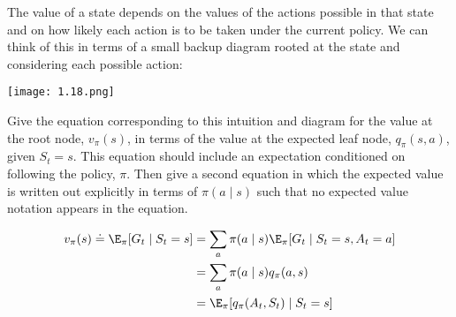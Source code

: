 
\begin{exercise}[Exercise 3.18]

The value of a state depends on the values of the actions possible in that state and on how likely each action is to be taken under the current policy.
We can think of this in terms of a small backup diagram rooted at the state and considering each possible action:

\begin{center}
    \texttt{[image: 1.18.png]}
\end{center}

Give the equation corresponding to this intuition and diagram for the value at the root node, $v_\pi(s)$, in terms of the value at the expected leaf node, $q_\pi(s, a)$, given $S_t = s$.
This equation should include an expectation conditioned on following the policy, $\pi$.
Then give a second equation in which the expected value is written out explicitly in terms of $\pi(a \mid s)$ such that no expected value notation appears in the equation.

\end{exercise}


\begin{solution}

\begin{align*}
    v_\pi(s)
    \doteq
    \E_\pi[G_t \mid S_t = s]
    & =
    \sum_a
        \pi(a \mid s)
        \E_\pi[G_t \mid S_t = s, A_t = a] \\
    & =
    \sum_a
        \pi(a \mid s)
        q_\pi(a, s) \\
    & =
    \E_\pi[q_\pi(A_t, S_t) \mid S_t = s]
\end{align*}

\end{solution}

